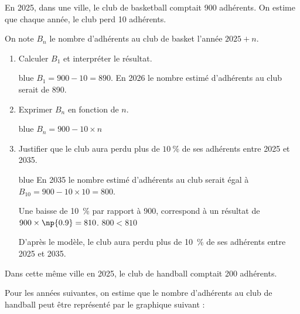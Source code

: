 En 2025, dans une ville, le club de basketball comptait 900 adhérents. On estime que chaque année, le club perd 10 adhérents.
	
	On note $B_{n}$ le nombre d'adhérents au club de basket l'année $2025+n$.
	
	\begin{enumerate}
		\item Calculer $B_{1}$ et interpréter le résultat.
		
		\begin{color}{blue}
		$B_{1} = 900 - 10 = 890$. En 2026 le nombre estimé d'adhérents au club serait de 890.
		\end{color}		
			
		
		\item Exprimer $B_{n}$ en fonction de $n$.
		
		\begin{color}{blue}
		$B_{n} = 900 - 10\times n $
		\end{color}		
	
	
	
		\item Justifier que le club aura perdu plus de $10~\%$ de ses adhérents entre 2025 et 2035.
		
		\begin{color}{blue}
		En 2035 le nombre estimé d'adhérents au club serait égal à $B_{10} = 900 - 10\times 10 = 800 $.
		
		Une baisse de 10~\% par rapport à 900, correspond à un résultat de $900\times \np{0.9} = 810$. $800 < 810$
		
		D'après le modèle, le club aura perdu plus de 10~\% de ses adhérents entre 2025 et 2035. 
		\end{color}		
		
	\end{enumerate}
	
	Dans cette même ville en 2025, le club de handball comptait 200 adhérents.
	
	Pour les années suivantes, on estime que le nombre d'adhérents au club de handball peut être représenté par le graphique suivant :
	
